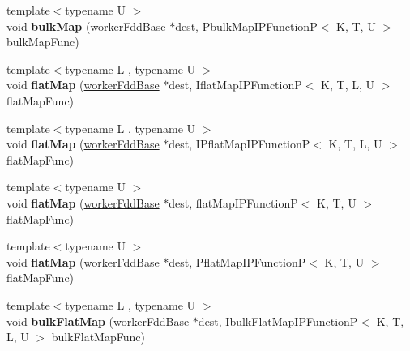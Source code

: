 \begin{DoxyCompactItemize}
{\footnotesize template$<$typename U $>$ }\\void {\bfseries bulk\+Map} (\hyperlink{classfaster_1_1workerFddBase}{worker\+Fdd\+Base} $\ast$dest, Pbulk\+Map\+I\+P\+FunctionP$<$ K, T, U $>$ bulk\+Map\+Func)
\item 
\hypertarget{classfaster_1_1__workerIFdd_aa17b7485c48adda5f291fd05993401be}{}\label{classfaster_1_1__workerIFdd_aa17b7485c48adda5f291fd05993401be} 
{\footnotesize template$<$typename L , typename U $>$ }\\void {\bfseries flat\+Map} (\hyperlink{classfaster_1_1workerFddBase}{worker\+Fdd\+Base} $\ast$dest, Iflat\+Map\+I\+P\+FunctionP$<$ K, T, L, U $>$ flat\+Map\+Func)
\item 
\hypertarget{classfaster_1_1__workerIFdd_a01712706bef8983d5715d5008b8f3bc7}{}\label{classfaster_1_1__workerIFdd_a01712706bef8983d5715d5008b8f3bc7} 
{\footnotesize template$<$typename L , typename U $>$ }\\void {\bfseries flat\+Map} (\hyperlink{classfaster_1_1workerFddBase}{worker\+Fdd\+Base} $\ast$dest, I\+Pflat\+Map\+I\+P\+FunctionP$<$ K, T, L, U $>$ flat\+Map\+Func)
\item 
\hypertarget{classfaster_1_1__workerIFdd_addd948777947f39bb4676e3516b797fb}{}\label{classfaster_1_1__workerIFdd_addd948777947f39bb4676e3516b797fb} 
{\footnotesize template$<$typename U $>$ }\\void {\bfseries flat\+Map} (\hyperlink{classfaster_1_1workerFddBase}{worker\+Fdd\+Base} $\ast$dest, flat\+Map\+I\+P\+FunctionP$<$ K, T, U $>$ flat\+Map\+Func)
\item 
\hypertarget{classfaster_1_1__workerIFdd_ac3f559fafc3463630d8febb26f626796}{}\label{classfaster_1_1__workerIFdd_ac3f559fafc3463630d8febb26f626796} 
{\footnotesize template$<$typename U $>$ }\\void {\bfseries flat\+Map} (\hyperlink{classfaster_1_1workerFddBase}{worker\+Fdd\+Base} $\ast$dest, Pflat\+Map\+I\+P\+FunctionP$<$ K, T, U $>$ flat\+Map\+Func)
\item 
\hypertarget{classfaster_1_1__workerIFdd_a5953db5f9f01e5e6d746e79eeb70b44e}{}\label{classfaster_1_1__workerIFdd_a5953db5f9f01e5e6d746e79eeb70b44e} 
{\footnotesize template$<$typename L , typename U $>$ }\\void {\bfseries bulk\+Flat\+Map} (\hyperlink{classfaster_1_1workerFddBase}{worker\+Fdd\+Base} $\ast$dest, Ibulk\+Flat\+Map\+I\+P\+FunctionP$<$ K, T, L, U $>$ bulk\+Flat\+Map\+Func)
\item 
\hypertarget{classfaster_1_1__workerIFdd_af8a719a7aed1b3a7334add9f1068445e}{}\label{classfaster_1_1__workerIFdd_af8a719a7aed1b3a7334add9f1068445e} 

\end{DoxyCompactItemize}
